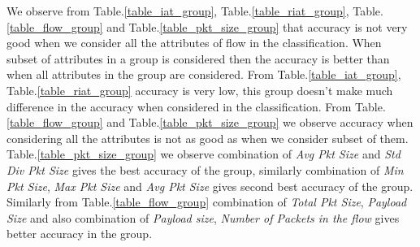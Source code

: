 \documentclass[conference]{IEEEtran}
\def\checkmark{\tikz\fill[scale=0.4](0,.35) -- (.25,0) -- (1,.7) -- (.25,.15) -- cycle;}
\begin{document}
\begin{table}
\begin{tabular}{|c|c|C{0.8in}|c|c|c|c|}
		\hline
	\end{tabular}
\end{table}
We observe from Table.\ref{table_iat_group}, Table.\ref{table_riat_group}, Table.\ref{table_flow_group} and Table.\ref{table_pkt_size_group} that accuracy is not very good when we consider all the attributes of flow in the classification. When subset of attributes in a group is considered then the accuracy is better than when all attributes in the group are considered. From Table.\ref{table_iat_group}, Table.\ref{table_riat_group} accuracy is very low, this group doesn't make much difference in the accuracy when considered in the classification. From Table.\ref{table_flow_group} and Table.\ref{table_pkt_size_group} we observe accuracy when considering all the attributes is not as good as when we consider subset of them. Table.\ref{table_pkt_size_group} we observe combination of \emph{Avg Pkt Size} and \emph{Std Div Pkt Size} gives the best accuracy of the group, similarly combination of \emph{Min Pkt Size}, \emph{Max Pkt Size} and \emph{Avg Pkt Size} gives second best accuracy of the group. Similarly from Table.\ref{table_flow_group} combination of \emph{Total Pkt Size}, \emph{Payload Size} and also combination of \emph{Payload size}, \emph{Number of Packets in the flow} gives better accuracy in the group. 
\end{document}
